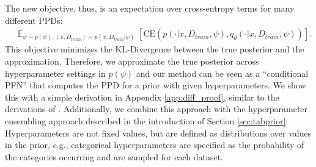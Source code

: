 \documentclass{article}
\DeclareMathOperator*{\E}{\mathbb{E}}
\newcommand{\frank}[1]{\todo[inline,color=yellow]{Frank: #1}}
\newcommand{\sam}[1]{\todo[inline,color=green]{Sam: #1}}
\begin{document}
The new objective, thus, is an expectation over cross-entropy terms for many different PPDs:
\begin{align}
	&\E_{\psi \sim p(\psi), (x,D_{train}) \sim p(x,D_{train}|\psi)} \left[\text{CE} \left(p(\cdot|x,D_{train},\psi),q_\theta(\cdot|x,D_{train},\psi)\right)\right]. \label{ppd_across_hypers}
\end{align}
This objective minimizes the KL-Divergence between the true posterior and the approximation.
Therefore, we approximate the true posterior across hyperparameter settings in $p(\psi)$ 
and our method can be seen as a ``conditional PFN'' that computes the PPD for a prior with given hyperparameters. We show this with a simple derivation in Appendix \ref{app:diff_proof}, similar to the derivations of \citet{muller-iclr2022}.
Additionally, we combine this approach with the hyperparameter ensembling approach described in the introduction of Section \ref{sec:tabprior}: Hyperparameters are not fixed values, but are defined as distributions over values in the prior, e.g., categorical hyperparameters are specified as the probability of the categories occurring and are sampled for each dataset.
\end{document}
